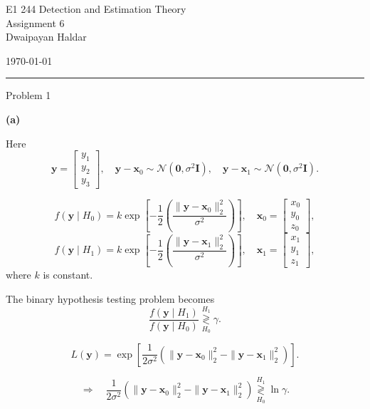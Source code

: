 \documentclass[12pt,a4paper,onecolumn]{exam}
\newcommand{\questionheader}[1]{%
  \begin{tcolorbox}[
    enhanced,
    colback=black,
    coltext=white,
    boxrule=0pt,
    fontupper=\Large\bfseries,
    arc=4mm
  ]
  #1
  \end{tcolorbox}%
}
\begin{document}
\begingroup
    \centering
    \LARGE E1 244 Detection and Estimation Theory\\
    \LARGE Assignment 6\\[0.5em]
    \large Dwaipayan Haldar\par
    \large \today\\[0.5em]
\endgroup
\noindent\rule{\textwidth}{0.5pt}
\printanswers
\renewcommand{\solutiontitle}{\noindent\textbf{Ans:}\enspace}

\questionheader{Problem 1}

\begin{solution}

\textbf{(a)}

Here
\[
\mathbf{y}=
\begin{bmatrix}
 y_1\\ y_2\\ y_3
\end{bmatrix},
\quad
\mathbf{y}-\mathbf{x}_0 \sim \mathcal{N}(\mathbf{0},\sigma^2\mathbf{I}),
\quad
\mathbf{y}-\mathbf{x}_1 \sim \mathcal{N}(\mathbf{0},\sigma^2\mathbf{I}).
\]

\[
f(\mathbf{y}\mid H_0)=k\exp\!\left[-\frac{1}{2}\left(\frac{\|\mathbf{y}-\mathbf{x}_0\|_2^2}{\sigma^2}\right)\right],
\quad
\mathbf{x}_0=\begin{bmatrix}x_0\\y_0\\z_0\end{bmatrix},
\]
\[
f(\mathbf{y}\mid H_1)=k\exp\!\left[-\frac{1}{2}\left(\frac{\|\mathbf{y}-\mathbf{x}_1\|_2^2}{\sigma^2}\right)\right],
\quad
\mathbf{x}_1=\begin{bmatrix}x_1\\y_1\\z_1\end{bmatrix},
\]
where $k$ is constant.

The binary hypothesis testing problem becomes
\[
\frac{f(\mathbf{y}\mid H_1)}{f(\mathbf{y}\mid H_0)}
\underset{H_0}{\overset{H_1}{\gtrless}} \gamma.
\]

\[
L(\mathbf{y})=
\exp\left[\frac{1}{2\sigma^2}\left(\|\mathbf{y}-\mathbf{x}_0\|_2^2-\|\mathbf{y}-\mathbf{x}_1\|_2^2\right)\right].
\]

\[
\Rightarrow\quad
\frac{1}{2\sigma^2}\left(\|\mathbf{y}-\mathbf{x}_0\|_2^2-\|\mathbf{y}-\mathbf{x}_1\|_2^2\right)
\underset{H_0}{\overset{H_1}{\gtrless}} \ln\gamma.
\]


\end{solution}
\end{document}
